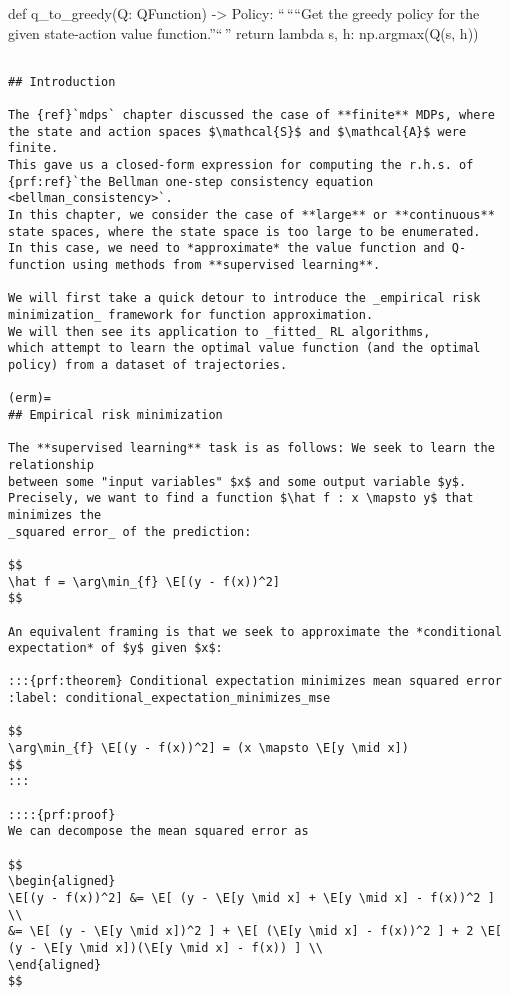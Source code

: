 def q\_to\_greedy(Q: QFunction) -\textgreater{} Policy: ``\,````Get the
greedy policy for the given state-action value function.''``\,'' return
lambda s, h: np.argmax(Q(s, h))

\begin{verbatim}

## Introduction

The {ref}`mdps` chapter discussed the case of **finite** MDPs, where the state and action spaces $\mathcal{S}$ and $\mathcal{A}$ were finite.
This gave us a closed-form expression for computing the r.h.s. of {prf:ref}`the Bellman one-step consistency equation <bellman_consistency>`.
In this chapter, we consider the case of **large** or **continuous** state spaces, where the state space is too large to be enumerated.
In this case, we need to *approximate* the value function and Q-function using methods from **supervised learning**.

We will first take a quick detour to introduce the _empirical risk minimization_ framework for function approximation.
We will then see its application to _fitted_ RL algorithms,
which attempt to learn the optimal value function (and the optimal policy) from a dataset of trajectories.

(erm)=
## Empirical risk minimization

The **supervised learning** task is as follows: We seek to learn the relationship
between some "input variables" $x$ and some output variable $y$.
Precisely, we want to find a function $\hat f : x \mapsto y$ that minimizes the
_squared error_ of the prediction:

$$
\hat f = \arg\min_{f} \E[(y - f(x))^2]
$$

An equivalent framing is that we seek to approximate the *conditional expectation* of $y$ given $x$:

:::{prf:theorem} Conditional expectation minimizes mean squared error
:label: conditional_expectation_minimizes_mse

$$
\arg\min_{f} \E[(y - f(x))^2] = (x \mapsto \E[y \mid x])
$$
:::

::::{prf:proof}
We can decompose the mean squared error as

$$
\begin{aligned}
\E[(y - f(x))^2] &= \E[ (y - \E[y \mid x] + \E[y \mid x] - f(x))^2 ] \\
&= \E[ (y - \E[y \mid x])^2 ] + \E[ (\E[y \mid x] - f(x))^2 ] + 2 \E[ (y - \E[y \mid x])(\E[y \mid x] - f(x)) ] \\
\end{aligned}
$$


\end{verbatim}
